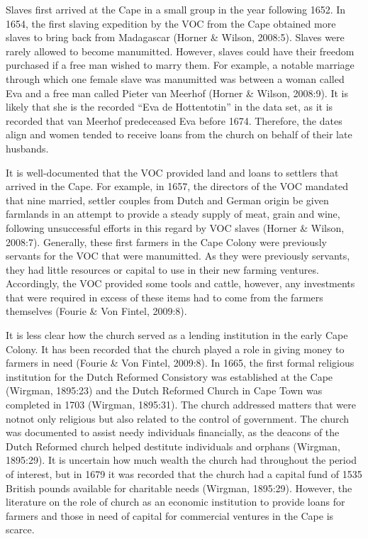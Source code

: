 \documentclass[11pt,preprint, authoryear]{elsarticle}
\numberwithin{equation}{section}
\numberwithin{figure}{section}
\numberwithin{table}{section}
\begin{document}
Slaves first arrived at the Cape in a small group in the year following
1652. In 1654, the first slaving expedition by the VOC from the Cape
obtained more slaves to bring back from Madagascar (Horner \& Wilson,
2008:5). Slaves were rarely allowed to become manumitted. However,
slaves could have their freedom purchased if a free man wished to marry
them. For example, a notable marriage through which one female slave was
manumitted was between a woman called Eva and a free man called Pieter
van Meerhof (Horner \& Wilson, 2008:9). It is likely that she is the
recorded ``Eva de Hottentotin'' in the data set, as it is recorded that
van Meerhof predeceased Eva before 1674. Therefore, the dates align and
women tended to receive loans from the church on behalf of their late
husbands.

It is well-documented that the VOC provided land and loans to settlers
that arrived in the Cape. For example, in 1657, the directors of the VOC
mandated that nine married, settler couples from Dutch and German origin
be given farmlands in an attempt to provide a steady supply of meat,
grain and wine, following unsuccessful efforts in this regard by VOC
slaves (Horner \& Wilson, 2008:7). Generally, these first farmers in the
Cape Colony were previously servants for the VOC that were manumitted.
As they were previously servants, they had little resources or capital
to use in their new farming ventures. Accordingly, the VOC provided some
tools and cattle, however, any investments that were required in excess
of these items had to come from the farmers themselves (Fourie \& Von
Fintel, 2009:8).

It is less clear how the church served as a lending institution in the
early Cape Colony. It has been recorded that the church played a role in
giving money to farmers in need (Fourie \& Von Fintel, 2009:8). In 1665,
the first formal religious institution for the Dutch Reformed Consistory
was established at the Cape (Wirgman, 1895:23) and the Dutch Reformed
Church in Cape Town was completed in 1703 (Wirgman, 1895:31). The church
addressed matters that were notnot only religious but also related to
the control of government. The church was documented to assist needy
individuals financially, as the deacons of the Dutch Reformed church
helped destitute individuals and orphans (Wirgman, 1895:29). It is
uncertain how much wealth the church had throughout the period of
interest, but in 1679 it was recorded that the church had a capital fund
of 1535 British pounds available for charitable needs (Wirgman,
1895:29). However, the literature on the role of church as an economic
institution to provide loans for farmers and those in need of capital
for commercial ventures in the Cape is scarce.
\end{document}
